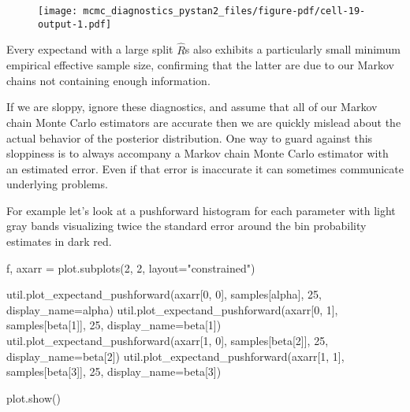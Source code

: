 \documentclass[
  letterpaper,
  DIV=11,
  numbers=noendperiod]{scrartcl}
\newenvironment{Shaded}{\begin{snugshade}}{\end{snugshade}}
\newcommand{\DecValTok}[1]{\textcolor[rgb]{0.68,0.00,0.00}{#1}}
\newcommand{\NormalTok}[1]{\textcolor[rgb]{0.00,0.23,0.31}{#1}}
\newcommand{\OperatorTok}[1]{\textcolor[rgb]{0.37,0.37,0.37}{#1}}
\newcommand{\StringTok}[1]{\textcolor[rgb]{0.13,0.47,0.30}{#1}}
\begin{document}
\begin{figure}[H]

{\centering \texttt{[image: mcmc\_diagnostics\_pystan2\_files/figure-pdf/cell-19-output-1.pdf]}

}

\end{figure}

Every expectand with a large split \(\hat{R}\)s also exhibits a
particularly small minimum empirical effective sample size, confirming
that the latter are due to our Markov chains not containing enough
information.

If we are sloppy, ignore these diagnostics, and assume that all of our
Markov chain Monte Carlo estimators are accurate then we are quickly
mislead about the actual behavior of the posterior distribution. One way
to guard against this sloppiness is to always accompany a Markov chain
Monte Carlo estimator with an estimated error. Even if that error is
inaccurate it can sometimes communicate underlying problems.

For example let's look at a pushforward histogram for each parameter
with light gray bands visualizing twice the standard error around the
bin probability estimates in dark red.

\begin{Shaded}
\begin{Highlighting}[]
\NormalTok{f, axarr }\OperatorTok{=}\NormalTok{ plot.subplots(}\DecValTok{2}\NormalTok{, }\DecValTok{2}\NormalTok{, layout}\OperatorTok{=}\StringTok{"constrained"}\NormalTok{)}

\NormalTok{util.plot\_expectand\_pushforward(axarr[}\DecValTok{0}\NormalTok{, }\DecValTok{0}\NormalTok{], samples[}\StringTok{\textquotesingle{}alpha\textquotesingle{}}\NormalTok{], }
                                \DecValTok{25}\NormalTok{, display\_name}\OperatorTok{=}\StringTok{\textquotesingle{}alpha\textquotesingle{}}\NormalTok{)}
\NormalTok{util.plot\_expectand\_pushforward(axarr[}\DecValTok{0}\NormalTok{, }\DecValTok{1}\NormalTok{], samples[}\StringTok{\textquotesingle{}beta[1]\textquotesingle{}}\NormalTok{], }
                                \DecValTok{25}\NormalTok{, display\_name}\OperatorTok{=}\StringTok{\textquotesingle{}beta[1]\textquotesingle{}}\NormalTok{)}
\NormalTok{util.plot\_expectand\_pushforward(axarr[}\DecValTok{1}\NormalTok{, }\DecValTok{0}\NormalTok{], samples[}\StringTok{\textquotesingle{}beta[2]\textquotesingle{}}\NormalTok{], }
                                \DecValTok{25}\NormalTok{, display\_name}\OperatorTok{=}\StringTok{\textquotesingle{}beta[2]\textquotesingle{}}\NormalTok{)}
\NormalTok{util.plot\_expectand\_pushforward(axarr[}\DecValTok{1}\NormalTok{, }\DecValTok{1}\NormalTok{], samples[}\StringTok{\textquotesingle{}beta[3]\textquotesingle{}}\NormalTok{], }
                                \DecValTok{25}\NormalTok{, display\_name}\OperatorTok{=}\StringTok{\textquotesingle{}beta[3]\textquotesingle{}}\NormalTok{)}

\NormalTok{plot.show()}
\end{Highlighting}
\end{Shaded}
\end{document}
